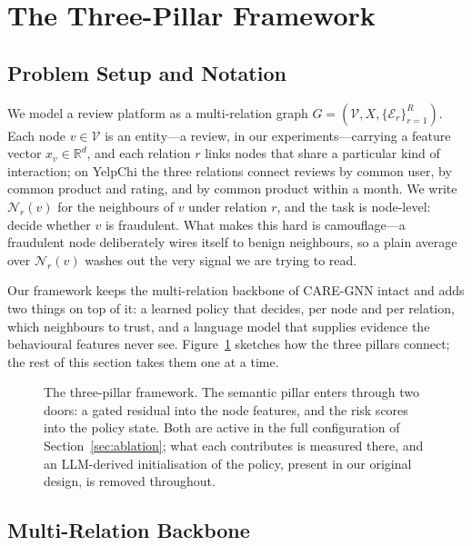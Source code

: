 \documentclass{conf}
\begin{document}
\section{The Three-Pillar Framework}
\label{sec:method}

\subsection{Problem Setup and Notation}

We model a review platform as a multi-relation graph
$G=(\mathcal{V}, X, \{\mathcal{E}_r\}_{r=1}^{R})$. Each node
$v\in\mathcal{V}$ is an entity---a review, in our experiments---carrying a
feature vector $x_v\in\mathbb{R}^{d}$, and each relation $r$ links nodes that
share a particular kind of interaction; on YelpChi the three relations connect
reviews by common user, by common product and rating, and by common product
within a month. We write $\mathcal{N}_r(v)$ for the neighbours of $v$ under
relation $r$, and the task is node-level: decide whether $v$ is fraudulent.
What makes this hard is camouflage---a fraudulent node deliberately wires
itself to benign neighbours, so a plain average over $\mathcal{N}_r(v)$ washes
out the very signal we are trying to read.

Our framework keeps the multi-relation backbone of CARE-GNN intact and adds two
things on top of it: a learned policy that decides, per node and per relation,
which neighbours to trust, and a language model that supplies evidence the
behavioural features never see. Figure~\ref{fig:arch} sketches how the three
pillars connect; the rest of this section takes them one at a time.

\begin{figure}[th]
\centering

\caption{The three-pillar framework. The semantic pillar enters through two
doors: a gated residual into the node features, and the risk scores into the
policy state. Both are active in the full configuration of
Section~\ref{sec:ablation}; what each contributes is measured there, and an
LLM-derived initialisation of the policy, present in our original design, is
removed throughout.}
\label{fig:arch}
\end{figure}

\subsection{Multi-Relation Backbone}
\end{document}
